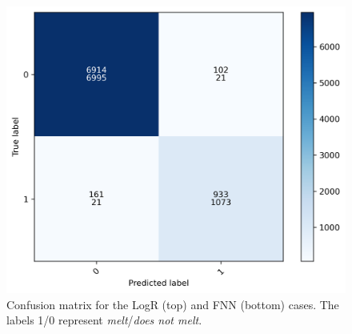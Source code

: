 \begin{figure}[htbp!] %
    \centering
    \includegraphics[width=0.45\linewidth]{figures/classification-synth_cnfm}
    \hfill
    \caption{Confusion matrix for the LogR (top) and FNN (bottom) cases. The labels 1/0 represent \textit{melt}/\textit{does not melt}.}
    \label{fig:pre-cnfm-syn}
\end{figure}

